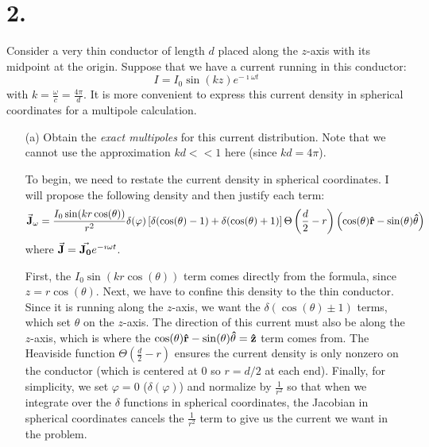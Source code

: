 \documentclass[a4paper,twoside]{article}
\begin{document}
\section*{2.}
Consider a very thin conductor of length $ d $ placed along the $ z $-axis with its midpoint at the origin. Suppose that we have a current running in this conductor:
\begin{equation}
    I = I_0 \sin(kz) e^{- \imath \omega t}
\end{equation}
with $ k = \frac{\omega}{c} = \frac{4 \pi}{d} $. It is more convenient to express this current density in spherical coordinates for a multipole calculation.
\begin{itemize}
    \item[(a)] Obtain the \textit{exact multipoles} for this current distribution. Note that we cannot use the approximation $ kd << 1 $ here (since $ kd = 4 \pi $).
        \begin{problem}
            To begin, we need to restate the current density in spherical coordinates. I will propose the following density and then justify each term:
            \begin{equation}
                \va{J}_{\omega} = \frac{I_0 \sin(kr \cos(\theta))}{r^2} \delta(\varphi) \left[ \delta(\cos(\theta) - 1) + \delta(\cos(\theta) + 1) \right] \Theta\left( \frac{d}{2} - r \right) \left( \cos(\theta) \vu{r} - \sin(\theta) \vu{\theta} \right)
            \end{equation}
            where $ \va{J} = \va{J_0} e^{- \imath \omega t} $.

            First, the $ I_0 \sin(kr \cos(\theta)) $ term comes directly from the formula, since $ z = r \cos(\theta) $. Next, we have to confine this density to the thin conductor. Since it is running along the $ z $-axis, we want the $ \delta(\cos(\theta) \pm 1) $ terms, which set $ \theta $ on the $ z $-axis. The direction of this current must also be along the $ z $-axis, which is where the $ \cos(\theta) \vu{r} - \sin(\theta) \vu{\theta} = \vu{z} $ term comes from. The Heaviside function $ \Theta\left( \frac{d}{2} - r \right) $ ensures the current density is only nonzero on the conductor (which is centered at $ 0 $ so $ r = d/2 $ at each end). Finally, for simplicity, we set $ \varphi = 0 $ ($ \delta(\varphi) $) and normalize by $ \frac{1}{r^2} $ so that when we integrate over the $\delta$ functions in spherical coordinates, the Jacobian in spherical coordinates cancels the $ \frac{1}{r^2} $ term to give us the current we want in the problem.


\end{problem}
\end{itemize}
\end{document}
